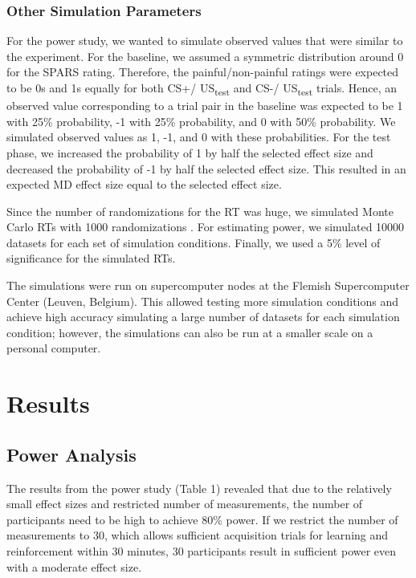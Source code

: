\documentclass{article}
\begin{document}
\subsubsection{Other Simulation Parameters}

For the power study, we wanted to simulate observed values that were similar to the experiment. For the baseline, we assumed a symmetric distribution around 0 for the SPARS rating. Therefore, the painful/non-painful ratings were expected to be 0s and 1s equally for both CS+/ US\textsubscript{test} and CS-/ US\textsubscript{test} trials. Hence, an observed value corresponding to a trial pair in the baseline was expected to be 1 with 25\% probability, -1 with 25\% probability, and 0 with 50\% probability. We simulated observed values as 1, -1, and 0 with these probabilities. For the test phase, we increased the probability of 1 by half the selected effect size and decreased the probability of -1 by half the selected effect size. This resulted in an expected MD effect size equal to the selected effect size. 

Since the number of randomizations for the RT was huge, we simulated Monte Carlo RTs with 1000 randomizations \parencite{Edgington1969}. For estimating power, we simulated 10000 datasets for each set of simulation conditions. Finally, we used a 5\% level of significance for the simulated RTs.

The simulations were run on supercomputer nodes at the Flemish Supercomputer Center (Leuven, Belgium). This allowed testing more simulation conditions and achieve high accuracy simulating a large number of datasets for each simulation condition; however, the simulations can also be run at a smaller scale on a personal computer. 

\section{Results}

\subsection{Power Analysis}

The results from the power study (Table 1) revealed that due to the relatively small effect sizes and restricted number of measurements, the number of participants need to be high to achieve 80\% power. If we restrict the number of measurements to 30, which allows sufficient acquisition trials for learning and reinforcement within 30 minutes, 30 participants result in sufficient power even with a moderate effect size. 
\end{document}
